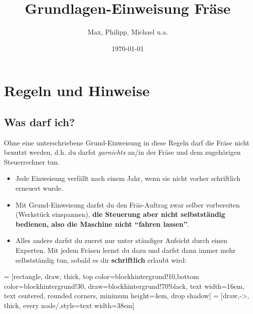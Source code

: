 \documentclass{\basedir/fablab-document}
\date{\today}
\author{Max, Philipp, Michael u.a.}
\title{Grundlagen-Einweisung Fräse}
\begin{document}
\section{Regeln und Hinweise}\label{regeln}
\subsection{Was darf ich?}
Ohne eine unterschriebene Grund-Einweisung in diese Regeln darf die Fräse nicht benutzt werden, d.h. du darfst \emph{garnichts} an/in der Fräse und dem zugehörigen Steuerrechner tun.
\begin{itemize}
 \item Jede Einweisung verfällt nach einem Jahr, wenn sie nicht vorher schriftlich erneuert wurde. 
 \item Mit Grund-Einweisung darfst du den Fräs-Auftrag zwar selber vorbereiten (Werkstück einspannen), \textbf{die Steuerung aber nicht selbstständig bedienen, also die Maschine nicht \enquote{fahren lassen}}.
 \item Alles andere darfst du zuerst nur unter ständiger Aufsicht durch einen Experten. Mit jedem Fräsen lernst du dazu und darfst dann immer mehr selbstständig tun, sobald es dir \textbf{schriftlich} erlaubt wird:
\end{itemize}
 = [rectangle, draw, thick, top color=blockhintergrund!10,bottom color=blockhintergrund!30, draw=blockhintergrund!70!black,
    text width=16em, text centered, rounded corners, minimum height=4em, drop shadow]
 = [draw,->, thick, every node/.style={text width=38em}]
\vspace{1em}
\end{document}
